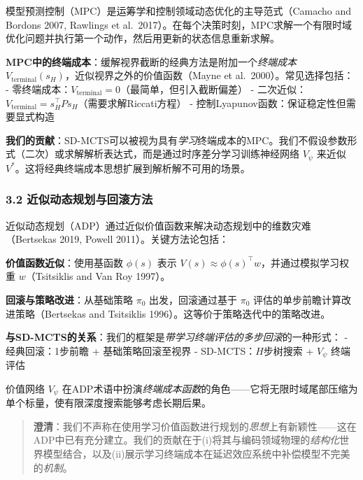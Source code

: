 \documentclass[UTF8]{ctexart}
\begin{document}
模型预测控制（MPC）是运筹学和控制领域动态优化的主导范式（Camacho and
Bordons 2007, Rawlings et
al.~2017）。在每个决策时刻，MPC求解一个有限时域优化问题并执行第一个动作，然后用更新的状态信息重新求解。

\textbf{MPC中的终端成本}：缓解视界截断的经典方法是附加一个\emph{终端成本}
\(V_{\text{terminal}}(s_H)\)，近似视界之外的价值函数（Mayne et
al.~2000）。常见选择包括： -
零终端成本：\(V_{\text{terminal}} = 0\)（最简单，但引入截断偏差） -
二次近似：\(V_{\text{terminal}} = s_H^\top P s_H\)（需要求解Riccati方程）
- 控制Lyapunov函数：保证稳定性但需要显式构造

\textbf{我们的贡献}：SD-MCTS可以被视为具有\emph{学习}终端成本的MPC。我们不假设参数形式（二次）或求解解析表达式，而是通过时序差分学习训练神经网络
\(V_\psi\) 来近似
\(V^*\)。这将经典终端成本思想扩展到解析解不可用的场景。

\hypertarget{ux8fd1ux4f3cux52a8ux6001ux89c4ux5212ux4e0eux56deux6edaux65b9ux6cd5}{%
\subsubsection{3.2
近似动态规划与回滚方法}\label{ux8fd1ux4f3cux52a8ux6001ux89c4ux5212ux4e0eux56deux6edaux65b9ux6cd5}}

近似动态规划（ADP）通过近似价值函数来解决动态规划中的维数灾难（Bertsekas
2019, Powell 2011）。关键方法论包括：

\textbf{价值函数近似}：使用基函数 \(\phi(s)\) 表示
\(V(s) \approx \phi(s)^\top w\)，并通过模拟学习权重 \(w\)（Tsitsiklis
and Van Roy 1997）。

\textbf{回滚与策略改进}：从基础策略 \(\pi_0\) 出发，回滚通过基于
\(\pi_0\) 评估的单步前瞻计算改进策略（Bertsekas and Tsitsiklis
1996）。这等价于策略迭代中的策略改进。

\textbf{与SD-MCTS的关系}：我们的框架是\emph{带学习终端评估的多步回滚}的一种形式：
- 经典回滚：1步前瞻 + 基础策略回滚至视界 - SD-MCTS：\(H\)步树搜索 +
\(V_\psi\) 终端评估

价值网络 \(V_\psi\)
在ADP术语中扮演\emph{终端成本函数}的角色------它将无限时域尾部压缩为单个标量，使有限深度搜索能够考虑长期后果。

\begin{quote}
\textbf{澄清}：我们不声称在使用学习价值函数进行规划的\emph{思想}上有新颖性------这在ADP中已有充分建立。我们的贡献在于(i)将其与编码领域物理的\emph{结构化}世界模型结合，以及(ii)展示学习终端成本在延迟效应系统中补偿模型不完美的\emph{机制}。
\end{quote}
\end{document}
